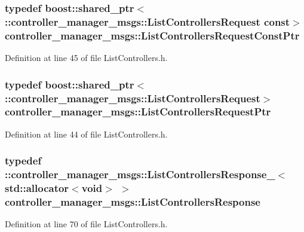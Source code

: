 \subsubsection[{\-List\-Controllers\-Request\-Const\-Ptr}]{\setlength{\rightskip}{0pt plus 5cm}typedef boost\-::shared\-\_\-ptr$<$ \-::{\bf controller\-\_\-manager\-\_\-msgs\-::\-List\-Controllers\-Request} const$>$ {\bf controller\-\_\-manager\-\_\-msgs\-::\-List\-Controllers\-Request\-Const\-Ptr}}\label{namespacecontroller__manager__msgs_ae6e6358d23d1fd3bd2a959adfa046ba3}


\-Definition at line 45 of file \-List\-Controllers.\-h.

\subsubsection[{\-List\-Controllers\-Request\-Ptr}]{\setlength{\rightskip}{0pt plus 5cm}typedef boost\-::shared\-\_\-ptr$<$ \-::{\bf controller\-\_\-manager\-\_\-msgs\-::\-List\-Controllers\-Request}$>$ {\bf controller\-\_\-manager\-\_\-msgs\-::\-List\-Controllers\-Request\-Ptr}}\label{namespacecontroller__manager__msgs_ac931f90120f51cc5765039140d2c6f2f}


\-Definition at line 44 of file \-List\-Controllers.\-h.

\subsubsection[{\-List\-Controllers\-Response}]{\setlength{\rightskip}{0pt plus 5cm}typedef \-::{\bf controller\-\_\-manager\-\_\-msgs\-::\-List\-Controllers\-Response\-\_\-}$<$std\-::allocator$<$void$>$ $>$ {\bf controller\-\_\-manager\-\_\-msgs\-::\-List\-Controllers\-Response}}\label{namespacecontroller__manager__msgs_ae9fd0d3b690f081fc9837ff02715e1e9}


\-Definition at line 70 of file \-List\-Controllers.\-h.


